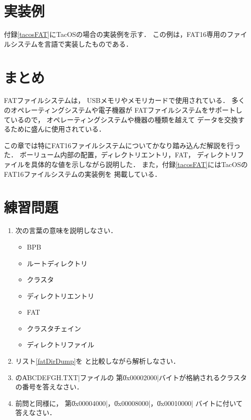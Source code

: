 \section{実装例}
付録\ref{tacosFAT}にTacOSの場合の実装例を示す．
この例は，FAT16専用のファイルシステムを{\cmm}言語で実装したものである．

\section{まとめ}
FATファイルシステムは，
USBメモリやメモリカードで使用されている．
多くのオペレーティングシステムや電子機器が
FATファイルシステムをサポートしているので，
オペレーティングシステムや機器の種類を越えて
データを交換するために盛んに使用されている．

この章では特にFAT16ファイルシステムについてかなり踏み込んだ解説を行った．
ボーリューム内部の配置，ディレクトリエントリ，FAT，
ディレクトリファイルを具体的な値を示しながら説明した．
また，付録\ref{tacosFAT}にはTacOSのFAT16ファイルシステムの実装例を
掲載している．

\section*{練習問題}
\begin{enumerate}
  \renewcommand{\labelenumi}{\ttfamily\arabic{chapter}.\arabic{enumi}}
  \setlength{\leftskip}{1em}
\item 次の言葉の意味を説明しなさい．
  \begin{itemize}
  \item BPB
  \item ルートディレクトリ
  \item クラスタ
  \item ディレクトリエントリ
  \item FAT
  \item クラスタチェイン
  \item ディレクトリファイル
  \end{itemize}
\item リスト\ref{fatDirDump}を
  と比較しながら解析しなさい．
\item {}の\|ABCDEFGH.TXT|ファイルの
  第\|0x00002000|バイトが格納されるクラスタの番号を答えなさい．
\item 前問と同様に，
  第\|0x00004000|，\|0x00008000|，\|0x00010000|
  バイトに付いて答えなさい．
\end{enumerate}
